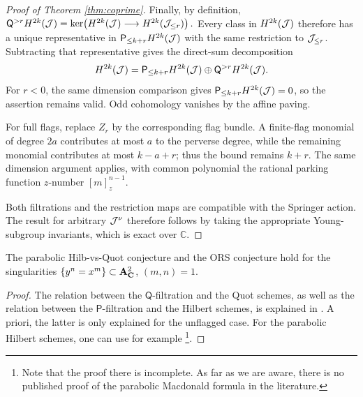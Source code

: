 \documentclass[a4paper,11pt,leqno]{amsart}
\begin{document}
\begin{proof}[Proof of Theorem \ref{thm:coprime}]
Finally, by definition,
$
 \mathsf{Q}^{>r}H^{2k}(\mathcal J)
 =
 \ker\!\left(
 H^{2k}(\mathcal J)\longrightarrow H^{2k}(\mathcal J_{\le r})
 \right).
$
Every class in $H^{2k}(\mathcal J)$ therefore has a unique representative
in $\mathsf{P}_{\le k+r}H^{2k}(\mathcal J)$ with the same restriction to
$\mathcal J_{\le r}$. Subtracting that representative gives the direct-sum
decomposition
\[
 H^{2k}(\mathcal J)
 =
 \mathsf{P}_{\le k+r}H^{2k}(\mathcal J)
 \oplus \mathsf{Q}^{>r}H^{2k}(\mathcal J).
\]
For $r<0$, the same dimension comparison gives
$\mathsf{P}_{\le k+r}H^{2k}(\mathcal J)=0$, so the assertion remains valid.
Odd cohomology vanishes by the affine paving.

For full flags, replace $Z_r$ by the corresponding flag bundle.
A finite-flag monomial of degree $2a$ contributes at most $a$
to the perverse degree, while the remaining monomial contributes
at most $k-a+r$; thus the bound remains $k+r$.
The same dimension argument applies, with common polynomial the
rational parking function $z$-number
$[m]_z^{n-1}$.

Both filtrations and the restriction maps are compatible with
the Springer action. The result for arbitrary $\mathcal J^\nu$ therefore follows by taking
the appropriate Young-subgroup invariants, which is exact over
$\mathbb C$.
\end{proof}
\begin{cor}
The parabolic Hilb-vs-Quot conjecture \cite[Conjecture 2]{KTpublished} and the ORS conjecture \cite[Conjecture 2]{ORS} hold for the singularities $\{y^n=x^m\}\subset \mathbf{A}_\mathbf{C}^2$, $(m,n)=1$.
\end{cor}
\begin{proof}
The relation between the $\mathsf{Q}$-filtration and the Quot schemes, as well as the relation between the $\mathsf{P}$-filtration and the Hilbert schemes, is explained in \cite{KTpublished}. A priori, the latter is only explained for the unflagged case. For the parabolic Hilbert schemes, one can use for example \cite[Proof of Theorem 9.7]{GORS}\footnote{Note that the proof there is incomplete. As far as we are aware, there is no published proof of the parabolic Macdonald formula in the literature.}. 
\end{proof}
\end{document}
